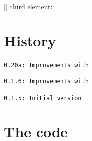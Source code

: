 \documentclass[11pt,a4paper]{ltxdoc}
\begin{document}
\begin{DemoCode}{}
[\myres]%
third element: \myres
\end{DemoCode}

\pagebreak

\section{History}

\texttt{0.20a: Improvements with }

\texttt{0.1.6: Improvements with }

\texttt{0.1.5: Initial version}

\section{The code}

\end{document}
